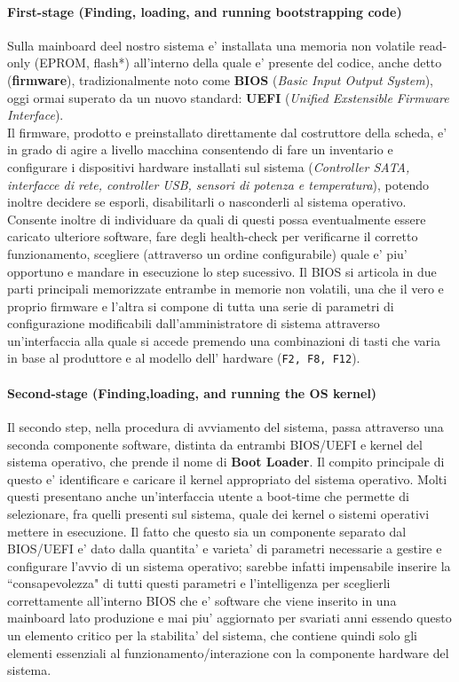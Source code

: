 \paragraph{First-stage (Finding, loading, and running bootstrapping code)}
Sulla mainboard deel nostro sistema e' installata una memoria non volatile read-only (EPROM, flash*) all'interno della quale e' presente del codice, anche detto (\textbf{firmware}), tradizionalmente noto come \textbf{BIOS} (\emph{Basic Input Output System}), oggi ormai superato da un nuovo standard: \textbf{UEFI} (\emph{Unified Exstensible Firmware Interface}). 
\\
Il firmware, prodotto e preinstallato direttamente dal costruttore della scheda, e' in grado di agire a livello macchina consentendo di fare un inventario e configurare i dispositivi hardware installati sul sistema (\emph{Controller SATA, interfacce di rete, controller USB, sensori di potenza e temperatura}), potendo inoltre decidere se esporli, disabilitarli o nasconderli al sistema operativo. Consente inoltre di individuare da quali di questi possa eventualmente essere caricato ulteriore software, fare degli health-check per verificarne il corretto funzionamento, scegliere (attraverso un ordine configurabile) quale e' piu' opportuno e mandare in esecuzione lo step sucessivo.
Il BIOS si articola in due parti principali memorizzate entrambe in memorie non volatili, una che il vero e proprio firmware e l'altra si compone di tutta una serie di parametri di configurazione modificabili dall'amministratore di sistema attraverso un'interfaccia alla quale si accede premendo una combinazioni di tasti che varia in base al produttore e al modello dell' hardware (\texttt{F2, F8, F12}).

\paragraph{Second-stage (Finding,loading, and running the OS kernel)}
Il secondo step, nella procedura di avviamento del sistema, passa attraverso una seconda componente software, distinta da entrambi BIOS/UEFI e kernel del sistema operativo, che prende il nome di \textbf{Boot Loader}. Il compito principale di questo e' identificare e caricare il kernel appropriato del sistema operativo. Molti questi presentano anche un'interfaccia utente a boot-time che permette di selezionare, fra quelli presenti sul sistema, quale dei kernel o sistemi operativi mettere in esecuzione. Il fatto che questo sia un componente separato dal BIOS/UEFI e' dato dalla quantita' e varieta' di parametri necessarie a gestire e configurare l'avvio di un sistema operativo; sarebbe infatti impensabile inserire la ``consapevolezza" di tutti questi parametri e l'intelligenza per sceglierli correttamente all'interno BIOS che e' software che viene inserito in una mainboard lato produzione e mai piu' aggiornato per svariati anni essendo questo un elemento critico per la stabilita' del sistema, che contiene quindi solo gli elementi essenziali al funzionamento/interazione con la componente hardware del sistema.

